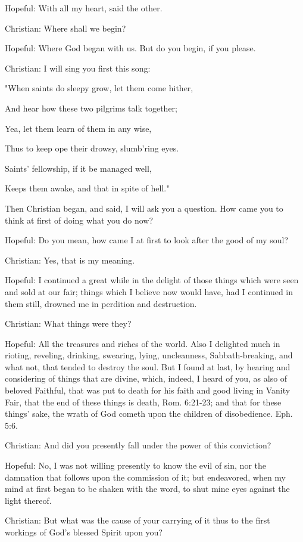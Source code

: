 Hopeful: With all my heart, said the other.

Christian: Where shall we begin?

Hopeful: Where God began with us. But do you begin, if you please.

Christian: I will sing you first this song:


"When saints do sleepy grow, let them come hither,

And hear how these two pilgrims talk together;

Yea, let them learn of them in any wise,

Thus to keep ope their drowsy, slumb'ring eyes.

Saints' fellowship, if it be managed well,

Keeps them awake, and that in spite of hell."

Then Christian began, and said, I will ask you a question. How came you
to think at first of doing what you do now?

Hopeful: Do you mean, how came I at first to look after the good of my
soul?

Christian: Yes, that is my meaning.

Hopeful: I continued a great while in the delight of those things which
were seen and sold at our fair; things which I believe now would have,
had I continued in them still, drowned me in perdition and destruction.

Christian: What things were they?

Hopeful: All the treasures and riches of the world. Also I delighted
much in rioting, reveling, drinking, swearing, lying, uncleanness,
Sabbath-breaking, and what not, that tended to destroy the soul. But I
found at last, by hearing and considering of things that are divine,
which, indeed, I heard of you, as also of beloved Faithful, that was
put to death for his faith and good living in Vanity Fair, that the end
of these things is death, Rom. 6:21-23; and that for these things'
sake, the wrath of God cometh upon the children of disobedience. Eph.
5:6.

Christian: And did you presently fall under the power of this
conviction?

Hopeful: No, I was not willing presently to know the evil of sin, nor
the damnation that follows upon the commission of it; but endeavored,
when my mind at first began to be shaken with the word, to shut mine
eyes against the light thereof.

Christian: But what was the cause of your carrying of it thus to the
first workings of God's blessed Spirit upon you?

